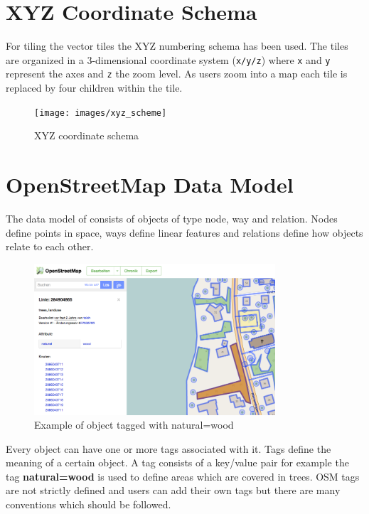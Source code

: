 \section{XYZ Coordinate Schema}\label{part1_xyz_coordinates}

\noindent\begin{minipage}[t]{0.48\linewidth}
    \vspace{0pt}
    For tiling the vector tiles the XYZ numbering schema has been used.
    The tiles are organized in a 3-dimensional coordinate system (\texttt{x/y/z}) where \texttt{x} and \texttt{y} represent the axes and \texttt{z} the zoom level. As users zoom into a map each tile is replaced by four children within the tile.
\end{minipage}
\hfill
\begin{minipage}[t]{0.48\linewidth}
    \vspace{-10pt}
    \begin{figure}[H]
    \centering
    \texttt{[image: images/xyz\_scheme]}
    \caption{XYZ coordinate schema}
    \end{figure}
\end{minipage}



\section{OpenStreetMap Data Model}\label{openstreetmap_data_model}

The data model of \osm{} consists of objects of type node, way and relation. Nodes define points in space, ways define linear features and relations define how objects relate to each other\cite{1_osm_wiki_2016}.

\begin{figure}[H]
\centering
\includegraphics[width=0.8\textwidth]{images/osm_data_model}
\caption{Example of object tagged with natural=wood}
\end{figure}

Every object can have one or more tags associated with it. Tags define the meaning of a certain object. A tag consists of a key/value pair for example the tag \textbf{natural=wood} is used to define areas which are covered in trees. OSM tags are not strictly defined and users can add their own tags but there are many conventions which should be followed.